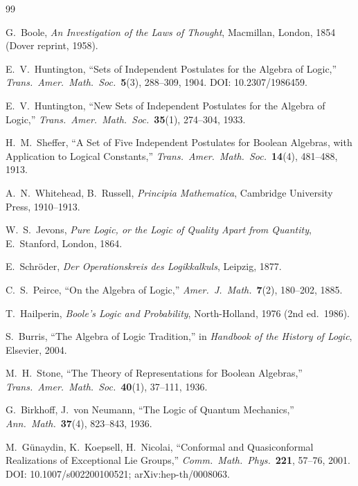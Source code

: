 \documentclass[11pt]{article}
\theoremstyle{definition}
\begin{document}
\begin{thebibliography}{99}

G.~Boole, \emph{An Investigation of the Laws of Thought},
Macmillan, London, 1854 (Dover reprint, 1958).

E.~V.~Huntington,
``Sets of Independent Postulates for the Algebra of Logic,''
\emph{Trans.\ Amer.\ Math.\ Soc.}\ \textbf{5}(3), 288--309, 1904.
DOI: 10.2307/1986459.

E.~V.~Huntington,
``New Sets of Independent Postulates for the Algebra of Logic,''
\emph{Trans.\ Amer.\ Math.\ Soc.}\ \textbf{35}(1), 274--304, 1933.

H.~M.~Sheffer,
``A Set of Five Independent Postulates for Boolean Algebras, with Application
to Logical Constants,''
\emph{Trans.\ Amer.\ Math.\ Soc.}\ \textbf{14}(4), 481--488, 1913.

A.~N.~Whitehead, B.~Russell, \emph{Principia Mathematica},
Cambridge University Press, 1910--1913.

W.~S.~Jevons, \emph{Pure Logic, or the Logic of Quality Apart from Quantity},
E.~Stanford, London, 1864.

E.~Schröder, \emph{Der Operationskreis des Logikkalkuls},
Leipzig, 1877.

C.~S.~Peirce, ``On the Algebra of Logic,'' \emph{Amer.\ J.\ Math.}\
\textbf{7}(2), 180--202, 1885.

T.~Hailperin, \emph{Boole's Logic and Probability},
North-Holland, 1976 (2nd ed.\ 1986).

S.~Burris, ``The Algebra of Logic Tradition,'' in \emph{Handbook of the
History of Logic}, Elsevier, 2004.

M.~H.~Stone, ``The Theory of Representations for Boolean Algebras,''
\emph{Trans.\ Amer.\ Math.\ Soc.}\ \textbf{40}(1), 37--111, 1936.

G.~Birkhoff, J.~von Neumann, ``The Logic of Quantum Mechanics,''
\emph{Ann.\ Math.}\ \textbf{37}(4), 823--843, 1936.

M.~Günaydin, K.~Koepsell, H.~Nicolai,
``Conformal and Quasiconformal Realizations of Exceptional Lie Groups,''
\emph{Comm.\ Math.\ Phys.}\ \textbf{221}, 57--76, 2001.
DOI: 10.1007/s002200100521; arXiv:hep-th/0008063.


\end{thebibliography}
\end{document}
